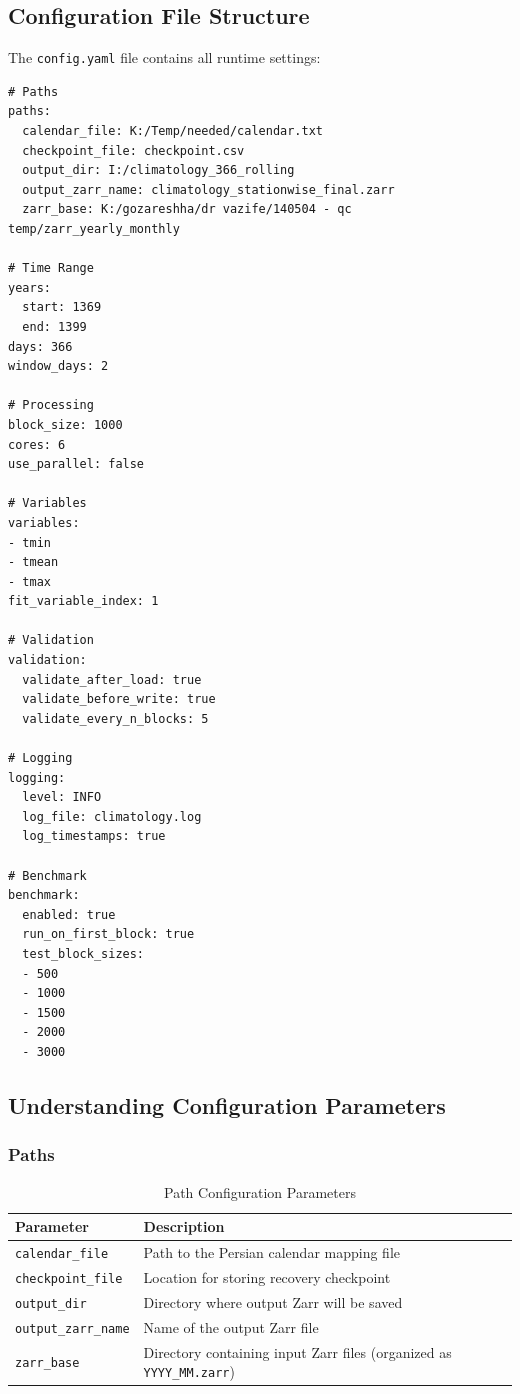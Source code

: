 ﻿\documentclass[12pt,a4paper]{report}
\begin{document}
\subsection{Configuration File Structure}
The \texttt{config.yaml} file contains all runtime settings:
\begin{lstlisting}[caption=Example config.yaml]
# Paths
paths:
  calendar_file: K:/Temp/needed/calendar.txt
  checkpoint_file: checkpoint.csv
  output_dir: I:/climatology_366_rolling
  output_zarr_name: climatology_stationwise_final.zarr
  zarr_base: K:/gozareshha/dr vazife/140504 - qc temp/zarr_yearly_monthly

# Time Range
years:
  start: 1369
  end: 1399
days: 366
window_days: 2

# Processing
block_size: 1000
cores: 6
use_parallel: false

# Variables
variables:
- tmin
- tmean
- tmax
fit_variable_index: 1

# Validation
validation:
  validate_after_load: true
  validate_before_write: true
  validate_every_n_blocks: 5

# Logging
logging:
  level: INFO
  log_file: climatology.log
  log_timestamps: true

# Benchmark
benchmark:
  enabled: true
  run_on_first_block: true
  test_block_sizes:
  - 500
  - 1000
  - 1500
  - 2000
  - 3000
\end{lstlisting}

\subsection{Understanding Configuration Parameters}
\subsubsection{Paths}
\begin{table}[H]
    \centering
    \caption{Path Configuration Parameters}
    \begin{tabular}{p{4cm} p{8cm}}
        \toprule
        \textbf{Parameter} & \textbf{Description} \\
        \midrule
        \texttt{calendar\_file} & Path to the Persian calendar mapping file \\
        \texttt{checkpoint\_file} & Location for storing recovery checkpoint \\
        \texttt{output\_dir} & Directory where output Zarr will be saved \\
        \texttt{output\_zarr\_name} & Name of the output Zarr file \\
        \texttt{zarr\_base} & Directory containing input Zarr files (organized as \texttt{YYYY\_MM.zarr}) \\
        \bottomrule
    \end{tabular}
\end{table}
\end{document}
